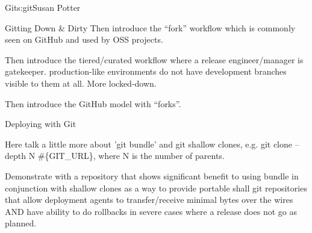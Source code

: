 \begin{aosachapter}{Git}{s:git}{Susan Potter}
\begin{aosasect1}{Gitting Down \& Dirty}
Then introduce the ``fork'' workflow which is commonly seen on GitHub and
used by OSS projects.

Then introduce the tiered/curated workflow where a release engineer/manager
is gatekeeper. production-like environments do not have development branches
visible to them at all. More locked-down.

Then introduce the GitHub model with ``forks''.

\end{aosasect1}

\begin{aosasect1}{Deploying with Git}

Here talk a little more about 'git bundle' and git shallow clones, e.g.
git clone --depth N \#\{GIT\_URL\}, where N is the number of parents.

Demonstrate with a repository that shows significant benefit to using
bundle in conjunction with shallow clones as a way to provide portable
shall git repositories that allow deployment agents to transfer/receive
minimal bytes over the wires AND have ability to do rollbacks in severe
cases where a release does not go as planned.

\end{aosasect1}

\end{aosachapter}
